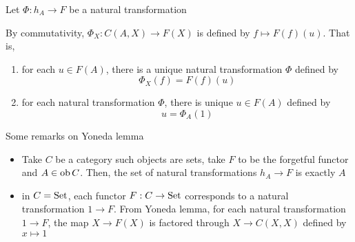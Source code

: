 \documentclass{report}
\begin{document}
\begin{longproof}
    Let $\Phi: h_A \to F$ be a natural transformation

    \begin{center}
    \end{center}

    By commutativity, $\Phi_X: C(A, X) \to F(X)$ is defined by $f \mapsto F(f)(u)$. That is,
    \begin{enumerate}
        \item for each $u \in F(A)$, there is a unique natural transformation $\Phi$ defined by
        $$
            \Phi_X(f) = F(f)(u)
        $$

        \item for each natural transformation $\Phi$, there is unique $u \in F(A)$ defined by
        $$
            u = \Phi_A(1)
        $$
    \end{enumerate}
\end{longproof}

\begin{remark}
    Some remarks on Yoneda lemma
    \begin{itemize}
        \item Take $C$ be a category such objects are sets, take $F$ to be the forgetful functor and $A \in \operatorname{ob} C$. Then, the set of natural transformations $h_A \to F$ is exactly $A$

        \item in $C = \operatorname{Set}$, each functor $F: C \to \operatorname{Set}$ corresponds to a natural transformation $1 \to F$. From Yoneda lemma, for each natural transformation $1 \to F$, the map $X \to F(X)$ is factored through $X \to C(X, X)$ defined by $x \mapsto 1$
    \end{itemize}
\end{remark}
\end{document}
